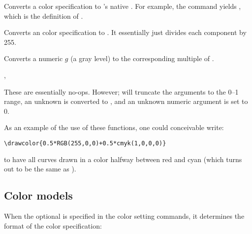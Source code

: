 \documentclass[letterpaper]{article}
\begin{document}
Converts a  color specification to \MP{}'s native . For
example, the command  yields , which is
the definition of .

\begin{cd}
%
\end{cd}

Converts an  color specification to . It essentially
just divides each component by 255.

\begin{cd}
%
\end{cd}

Converts a numeric $g$ (a gray level) to the corresponding multiple of
.

\begin{cd}
,
%
%
\end{cd}

These are essentially no-ops. However;  will truncate the
arguments to the 0--1 range,  an unknown  is converted to
, and an unknown numeric argument is set to 0.

\medskip
As an example of the use of these functions, one could conceivable
write:
\begin{verbatim}
\drawcolor{0.5*RGB(255,0,0)+0.5*cmyk(1,0,0,0)}
\end{verbatim}
to have all curves drawn in a color halfway between red and cyan (which
turns out to be the same as ).

\subsection{Color models}\label{colormodels}

When the optional  is specified in the color setting
commands, it determines the format of the color specification:

\medskip
{}
\end{document}
